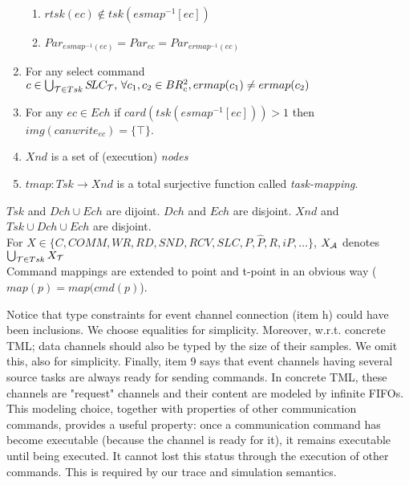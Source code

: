 \documentclass{article}
\begin{document}
\begin{definition}
\begin{enumerate}
\begin{enumerate}
			\item $rtsk(ec)\notin tsk(esmap^{-1}[ec])$
			\item $Par_{esmap^{-1}(ec)}=Par_{ec}=Par_{ermap^{-1}(ec)}$
			\end{enumerate}
\item For any select command $c\in\bigcup_{{\cal T}\in Tsk}S\!LC_{\cal T},\,\forall c_1,c_2\in BR_c^2, ermap(c_1)\neq ermap(c_2)$
\item For any $ec\in Ech$ if $card(tsk(esmap^{-1}[ec]))>1$ then $img(canwrite_{ec})=\{\top\}$.
\item $Xnd$ is a set of (execution) {\em nodes}
\item $tmap: T\!sk\rightarrow Xnd$ is a total surjective function called {\em task-mapping}.
\end{enumerate}
$Tsk$ and $Dch\cup Ech$ are dijoint. $Dch$ and $Ech$ are disjoint. $Xnd$ and $Tsk\cup Dch\cup Ech$ are disjoint.\\
For $X\in\{C,COMM,W\!R,RD,S\!N\!D,RCV,S\!LC,P,\hat P,R,iP,\ldots\}$, $X_{\cal A}$ denotes $\bigcup_{{\cal T}\in Tsk}X_{\cal T}$\\
Command mappings are extended to point and t-point in an obvious way ($map(p)=map(cmd(p)$).
\end{definition}
Notice that type constraints for event channel connection (item h) could have been inclusions. We choose equalities for simplicity. Moreover, w.r.t. concrete TML; data channels should also be typed by the size of their samples. We omit this, also for simplicity. Finally, item 9 says that event channels having several source tasks are always ready for sending commands. In concrete TML, these channels are "request" channels and their content are modeled by infinite FIFOs. This modeling choice, together with properties of other communication commands, provides a useful property: once a communication command has become executable (because the channel is ready for it), it remains executable until being executed. It cannot lost this status through the execution of other commands. This is required by our trace and simulation semantics.
\end{document}
